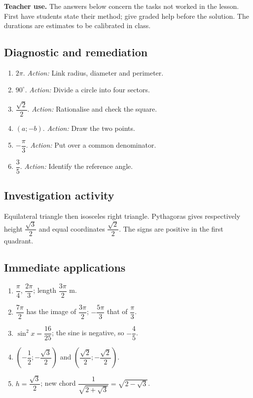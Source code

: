 \label{C10-CORR}
\textbf{Teacher use.} The answers below concern the tasks not worked in the lesson. First have students state their method; give graded help before the solution. The durations are estimates to be calibrated in class.
\subsection*{Diagnostic and remediation}
\begin{enumerate}
\item $2\pi$. \textit{Action:} Link radius, diameter and perimeter.
\item $90^\circ$. \textit{Action:} Divide a circle into four sectors.
\item $\dfrac{\sqrt 2}{2}$. \textit{Action:} Rationalise and check the square.
\item $(a;-b)$. \textit{Action:} Draw the two points.
\item $-\dfrac{\pi}{3}$. \textit{Action:} Put over a common denominator.
\item $\dfrac{3}{5}$. \textit{Action:} Identify the reference angle.
\end{enumerate}
\subsection*{Investigation activity}
Equilateral triangle then isosceles right triangle. Pythagoras gives respectively height $\dfrac{\sqrt 3}{2}$ and equal coordinates $\dfrac{\sqrt 2}{2}$. The signs are positive in the first quadrant.
\subsection*{Immediate applications}
\begin{enumerate}
\item $\dfrac{\pi}{4}$, $\dfrac{2\pi}{3}$; length $\dfrac{3\pi}{2}$ m.
\item $\dfrac{7\pi}{2}$ has the image of $\dfrac{3\pi}{2}$; $-\dfrac{5\pi}{3}$ that of $\dfrac{\pi}{3}$.
\item $\sin ^2x=\dfrac{16}{25}$; the sine is negative, so $-\dfrac{4}{5}$.
\item $(-\dfrac{1}{2};-\dfrac{\sqrt 3}{2})$ and $(\dfrac{\sqrt 2}{2};-\dfrac{\sqrt 2}{2})$.
\item $h=\dfrac{\sqrt 3}{2}$; new chord $\dfrac{1}{\sqrt {2+\sqrt3}}=\sqrt {2-\sqrt3}$.
\end{enumerate}
